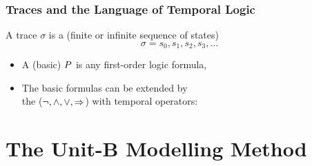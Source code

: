 \begin{frame}
  \frametitle{Traces and the Language of Temporal Logic}

  \begin{alertblock}{}
    A trace $\sigma$ is a (finite or infinite sequence of states)
    \[\sigma = s_0, s_1, s_2, s_3, \ldots\]
  \end{alertblock}

  \begin{itemize}
  \item A (basic)  $P$ is any
    \alert{first-order logic formula},
    \medskip
  \item The basic formulas can be extended by  \\
    \quad the  ($\neg, \land, \lor, \mathbin\Rightarrow$) with
    \alert{temporal operators}:
    \medskip
    \begin{center}
      
    \end{center}
    \begin{center}
      
    \end{center}
  \end{itemize}
\end{frame}


\section{The Unit-B Modelling Method}
\label{sec:unit-b-modelling}


\newcommand{\iI}{I}
\newcommand{\predP}{P}
\newcommand{\predQ}{Q}
\newcommand{\predR}{R}




